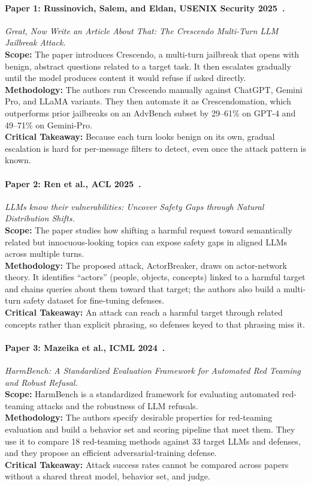 \documentclass[sigconf,nonacm]{acmart}
\begin{document}
\paragraph{Paper 1: Russinovich, Salem, and Eldan, USENIX Security 2025~\cite{russinovich2025crescendo}.}
\emph{Great, Now Write an Article About That: The Crescendo Multi-Turn LLM Jailbreak Attack.}\\
\textbf{Scope:} The paper introduces Crescendo, a multi-turn jailbreak that opens with benign, abstract questions related to a target task. It then escalates gradually until the model produces content it would refuse if asked directly.\\
\textbf{Methodology:} The authors run Crescendo manually against ChatGPT, Gemini Pro, and LLaMA variants. They then automate it as Crescendomation, which outperforms prior jailbreaks on an AdvBench subset by 29--61\% on GPT-4 and 49--71\% on Gemini-Pro.\\
\textbf{Critical Takeaway:} Because each turn looks benign on its own, gradual escalation is hard for per-message filters to detect, even once the attack pattern is known.

\paragraph{Paper 2: Ren et al., ACL 2025~\cite{ren2025llms}.}
\emph{LLMs know their vulnerabilities: Uncover Safety Gaps through Natural Distribution Shifts.}\\
\textbf{Scope:} The paper studies how shifting a harmful request toward semantically related but innocuous-looking topics can expose safety gaps in aligned LLMs across multiple turns.\\
\textbf{Methodology:} The proposed attack, ActorBreaker, draws on actor-network theory. It identifies ``actors'' (people, objects, concepts) linked to a harmful target and chains queries about them toward that target; the authors also build a multi-turn safety dataset for fine-tuning defenses.\\
\textbf{Critical Takeaway:} An attack can reach a harmful target through related concepts rather than explicit phrasing, so defenses keyed to that phrasing miss it.

\paragraph{Paper 3: Mazeika et al., ICML 2024~\cite{mazeika2024harmbench}.}
\emph{HarmBench: A Standardized Evaluation Framework for Automated Red Teaming and Robust Refusal.}\\
\textbf{Scope:} HarmBench is a standardized framework for evaluating automated red-teaming attacks and the robustness of LLM refusals.\\
\textbf{Methodology:} The authors specify desirable properties for red-teaming evaluation and build a behavior set and scoring pipeline that meet them. They use it to compare 18 red-teaming methods against 33 target LLMs and defenses, and they propose an efficient adversarial-training defense.\\
\textbf{Critical Takeaway:} Attack success rates cannot be compared across papers without a shared threat model, behavior set, and judge.
\end{document}

